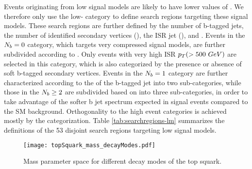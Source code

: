 Events originating from low \dm{} signal models are likely to have lower values of \mtb. We therefore only use the low-\mtb{} category to define search regions targeting these signal models. These search regions are further defined by the number of b-tagged jets, the number of identified secondary vertices (\nsv), the ISR jet \pt{} (\ptb), and \met. Events in the $N_{b}=0$ category, which targets very compressed signal models, are further subdivided according to \nj. Only events with very high ISR $p_{T}(>500~GeV)$ are selected in this category, which is also categorized by the presence or absence of soft b-tagged secondary vertices. Events in the $N_{b}=1$ category are further characterized according to the \pt{} of the b-tagged jet into two sub-categories, while those in the $N_{b}\geq2$ are subdivided based on \ptbonetwo{} into three sub-categories, in order to take advantage of the softer b jet \pt{} spectrum expected in signal events compared to the SM background. Orthogonality to the high \dm{} event categories is achieved mostly by the \mtb{} categorization. Table \ref{tab:searchregions-lm}  summarizes the definitions of the 53 disjoint search regions targeting low \dm{} signal models.

\begin{figure}
 	\centering
	\texttt{[image: topSquark\_mass\_decayModes.pdf]}
 	\caption[Top Squark Decay Modes]{Mass parameter space for different decay modes of the top squark.}
 	\label{StopParameterSpace} 
\end{figure}


